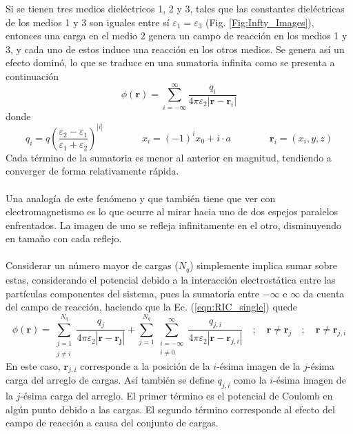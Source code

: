 \documentclass[12pt, oneside, numbers, spanish]{ezthesis}
\numberwithin{equation}{section}
\begin{document}
\noindent
Si se tienen tres medios dieléctricos 1, 2 y 3, tales que las constantes dieléctricas de los medios 1 y 3 son iguales entre sí $\varepsilon_1 = \varepsilon_3$ (Fig. \ref{Fig:Infty_Images}), entonces una carga en el medio 2 genera un campo de reacción en los medios 1 y 3, y cada uno de estos induce una reacción en los otros medios. Se genera así un efecto dominó, lo que se traduce en una sumatoria infinita \cite{Pei-kun} como se presenta a continuación
\begin{equation}\label{eqn:RIC_single}
\phi(\mathbf{r}) = \sum_{i=-\infty}^\infty\frac{q_i}{4\pi\varepsilon_2|\mathbf{r} - \mathbf{r}_i|}
\end{equation}
donde
\begin{equation}\label{eqn:RIC_terms}
q_i = q\left(\frac{\varepsilon_2 - \varepsilon_1}{\varepsilon_1 + \varepsilon_2}\right)^{|i|} \qquad\qquad x_i=(-1)^ix_0 + i\cdot a \qquad\qquad \mathbf{r}_i=(x_i,y,z)
\end{equation}
Cada término de la sumatoria es menor al anterior en magnitud, tendiendo a converger de forma relativamente rápida.\\\\
Una analogía de este fenómeno y que también tiene que ver con electromagnetismo es lo que ocurre al mirar hacia uno de dos espejos paralelos enfrentados. La imagen de uno se refleja infinitamente en el otro, disminuyendo en tamaño con cada reflejo.\\\\
Considerar un número mayor de cargas ($N_q$) simplemente implica sumar sobre estas, considerando el potencial debido a la interacción electrostática entre las partículas componentes del sistema, pues la sumatoria entre $-\infty$ e $\infty$ da cuenta del campo de reacción, haciendo que la Ec. (\ref{eqn:RIC_single}) quede
\begin{equation}\label{eqn:RIC_multi}
\phi(\mathbf{r}) = \sum_{\substack{j = 1\\j\neq i}}^{N_q} \frac{q_j}{4\pi\varepsilon_2|\mathbf{r} - \mathbf{r_j}|} + \sum_{j=1}^{N_q}\sum_{\substack{i=-\infty\\i\neq 0}}^\infty\frac{q_{j,i}}{4\pi\varepsilon_2|\mathbf{r} - \mathbf{r}_{j,i}|}\quad ; \quad \mathbf{r} \neq \mathbf{r}_j\quad ; \quad \mathbf{r} \neq \mathbf{r}_{j,i}
\end{equation}
En este caso, $\mathbf{r}_{j,i}$ corresponde a la posición de la $i$-ésima imagen de la $j$-ésima carga del arreglo de cargas. Así también se define $q_{j,i}$ como la $i$-ésima imagen de la $j$-ésima carga del arreglo. El primer término es el potencial de Coulomb en algún punto debido a las cargas. El segundo término corresponde al efecto del campo de reacción a causa del conjunto de cargas.\\\\
\end{document}
